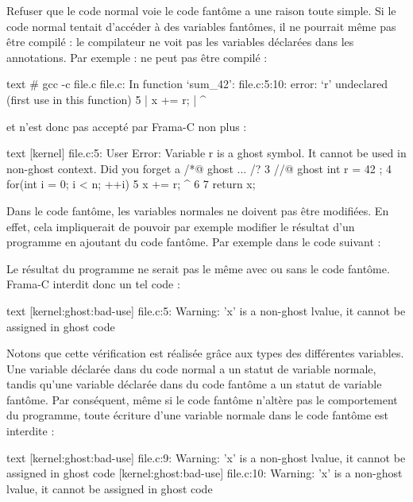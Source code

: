 Refuser que le code normal voie le code fantôme a une raison toute simple. Si le
code normal tentait d'accéder à des variables fantômes, il ne pourrait même pas
être compilé : le compilateur ne voit pas les variables déclarées dans les
annotations. Par exemple :
ne peut pas être compilé :
\begin{CodeBlock}{text}
# gcc -c file.c
file.c: In function ‘sum_42’:
file.c:5:10: error: ‘r’ undeclared (first use in this function)
    5 |     x += r;
      |          ^
\end{CodeBlock}
et n'est donc pas accepté par Frama-C non plus :
\begin{CodeBlock}{text}
[kernel] file.c:5: User Error:
Variable r is a ghost symbol. It cannot be used in non-ghost context. Did you forget a /*@ ghost ... /?
  3       //@ ghost int r = 42 ;
  4       for(int i = 0; i < n; ++i){
  5         x += r;
                 ^
  6       }
  7       return x;
\end{CodeBlock}


Dans le code fantôme, les variables normales ne doivent pas être modifiées. En effet,
cela impliquerait de pouvoir par exemple modifier le résultat d'un programme en
ajoutant du code fantôme. Par exemple dans le code suivant :




Le résultat du programme ne serait pas le même avec ou sans le code fantôme.
Frama-C interdit donc un tel code :


\begin{CodeBlock}{text}
[kernel:ghost:bad-use] file.c:5: Warning:
  'x' is a non-ghost lvalue, it cannot be assigned in ghost code
\end{CodeBlock}


Notons que cette vérification est réalisée grâce aux types des différentes variables.
Une variable déclarée dans du code normal a un statut de variable normale, tandis
qu'une variable déclarée dans du code fantôme a un statut de variable fantôme.
Par conséquent, même si le code fantôme n'altère pas le comportement du
programme, toute écriture d'une variable normale dans le code fantôme est interdite :




\begin{CodeBlock}{text}
[kernel:ghost:bad-use] file.c:9: Warning:
  'x' is a non-ghost lvalue, it cannot be assigned in ghost code
[kernel:ghost:bad-use] file.c:10: Warning:
  'x' is a non-ghost lvalue, it cannot be assigned in ghost code
\end{CodeBlock}



